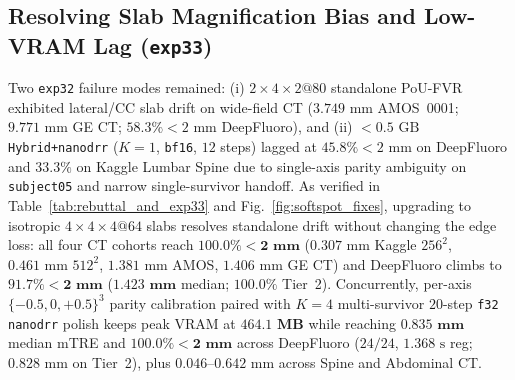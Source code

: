 \documentclass[runningheads]{llncs}
\begin{document}
\subsection{Resolving Slab Magnification Bias and Low-VRAM Lag (\texttt{exp33})}
Two \texttt{exp32} failure modes remained: (i) $2{\times}4{\times}2@80$ standalone PoU-FVR exhibited lateral/CC slab drift on wide-field CT ($3.749\text{ mm}$ AMOS~0001; $9.771\text{ mm}$ GE CT; $58.3\% <2\text{ mm}$ DeepFluoro), and (ii) $<0.5\text{ GB}$ \texttt{Hybrid+nanodrr} ($K{=}1$, \texttt{bf16}, $12$ steps) lagged at $45.8\% <2\text{ mm}$ on DeepFluoro and $33.3\%$ on Kaggle Lumbar Spine due to single-axis parity ambiguity on \texttt{subject05} and narrow single-survivor handoff. As verified in Table~\ref{tab:rebuttal_and_exp33} and Fig.~\ref{fig:softspot_fixes}, upgrading to isotropic $4{\times}4{\times}4@64$ slabs resolves standalone drift without changing the edge loss: all four CT cohorts reach $\mathbf{100.0\% <2\text{ mm}}$ ($0.307\text{ mm}$ Kaggle $256^2$, $0.461\text{ mm}$ $512^2$, $1.381\text{ mm}$ AMOS, $1.406\text{ mm}$ GE CT) and DeepFluoro climbs to $\mathbf{91.7\% <2\text{ mm}}$ ($\mathbf{1.423\text{ mm}}$ median; $100.0\%$ Tier~2). Concurrently, per-axis $\{-0.5, 0, +0.5\}^3$ parity calibration paired with $K{=}4$ multi-survivor $20$-step \texttt{f32} \texttt{nanodrr} polish keeps peak VRAM at $\mathbf{464.1\text{ MB}}$ while reaching $\mathbf{0.835\text{ mm}}$ median mTRE and $\mathbf{100.0\% <2\text{ mm}}$ across DeepFluoro ($24/24$, $1.368\text{ s}$ reg; $0.828\text{ mm}$ on Tier~2), plus $0.046\text{--}0.642\text{ mm}$ across Spine and Abdominal CT.
\end{document}
